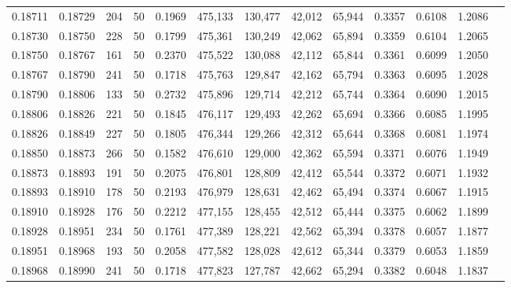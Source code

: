 \begin{tabular}{rrrrrrrrrrrrr}
0.18711 & 0.18729 &   204 &  50 &                                     0.1969 & 475,133 & 130,477 &  42,012 &  65,944 & 0.3357 & 0.6108 & 1.2086 \\
0.18730 & 0.18750 &   228 &  50 &                                     0.1799 & 475,361 & 130,249 &  42,062 &  65,894 & 0.3359 & 0.6104 & 1.2065 \\
0.18750 & 0.18767 &   161 &  50 &                                     0.2370 & 475,522 & 130,088 &  42,112 &  65,844 & 0.3361 & 0.6099 & 1.2050 \\
0.18767 & 0.18790 &   241 &  50 &                                     0.1718 & 475,763 & 129,847 &  42,162 &  65,794 & 0.3363 & 0.6095 & 1.2028 \\
0.18790 & 0.18806 &   133 &  50 &                                     0.2732 & 475,896 & 129,714 &  42,212 &  65,744 & 0.3364 & 0.6090 & 1.2015 \\
0.18806 & 0.18826 &   221 &  50 &                                     0.1845 & 476,117 & 129,493 &  42,262 &  65,694 & 0.3366 & 0.6085 & 1.1995 \\
0.18826 & 0.18849 &   227 &  50 &                                     0.1805 & 476,344 & 129,266 &  42,312 &  65,644 & 0.3368 & 0.6081 & 1.1974 \\
0.18850 & 0.18873 &   266 &  50 &                                     0.1582 & 476,610 & 129,000 &  42,362 &  65,594 & 0.3371 & 0.6076 & 1.1949 \\
0.18873 & 0.18893 &   191 &  50 &                                     0.2075 & 476,801 & 128,809 &  42,412 &  65,544 & 0.3372 & 0.6071 & 1.1932 \\
0.18893 & 0.18910 &   178 &  50 &                                     0.2193 & 476,979 & 128,631 &  42,462 &  65,494 & 0.3374 & 0.6067 & 1.1915 \\
0.18910 & 0.18928 &   176 &  50 &                                     0.2212 & 477,155 & 128,455 &  42,512 &  65,444 & 0.3375 & 0.6062 & 1.1899 \\
0.18928 & 0.18951 &   234 &  50 &                                     0.1761 & 477,389 & 128,221 &  42,562 &  65,394 & 0.3378 & 0.6057 & 1.1877 \\
0.18951 & 0.18968 &   193 &  50 &                                     0.2058 & 477,582 & 128,028 &  42,612 &  65,344 & 0.3379 & 0.6053 & 1.1859 \\
0.18968 & 0.18990 &   241 &  50 &                                     0.1718 & 477,823 & 127,787 &  42,662 &  65,294 & 0.3382 & 0.6048 & 1.1837 \\

\end{tabular}
